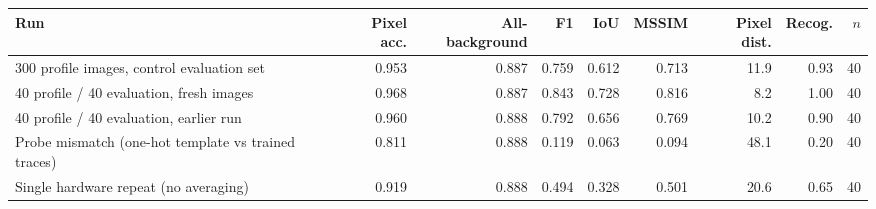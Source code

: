 \begin{tabular}{lrrrrrrrr}
\hline
Run & Pixel acc. & All-background & F1 & IoU & MSSIM & Pixel dist. & Recog. & $n$ \\
\hline
300 profile images, control evaluation set & 0.953 & 0.887 & 0.759 & 0.612 & 0.713 & 11.9 & 0.93 & 40 \\
40 profile / 40 evaluation, fresh images & 0.968 & 0.887 & 0.843 & 0.728 & 0.816 & 8.2 & 1.00 & 40 \\
40 profile / 40 evaluation, earlier run & 0.960 & 0.888 & 0.792 & 0.656 & 0.769 & 10.2 & 0.90 & 40 \\
Probe mismatch (one-hot template vs trained traces) & 0.811 & 0.888 & 0.119 & 0.063 & 0.094 & 48.1 & 0.20 & 40 \\
Single hardware repeat (no averaging) & 0.919 & 0.888 & 0.494 & 0.328 & 0.501 & 20.6 & 0.65 & 40 \\
\hline
\end{tabular}
